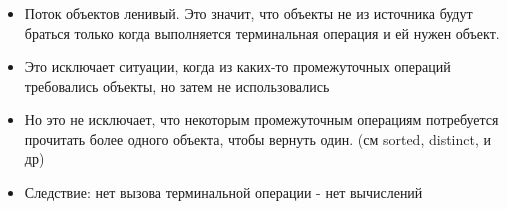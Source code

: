 \begin{frame}
\frametitle{\insertsection} 
\framesubtitle{\insertsubsection}
\begin{itemize}
	\item Поток объектов ленивый. Это значит, что объекты не из источника будут браться только когда выполняется терминальная операция и ей нужен объект.
	\item Это исключает ситуации, когда из каких-то промежуточных операций требовались объекты, но затем не использовались
	\item Но это не исключает, что некоторым промежуточным операциям потребуется прочитать более одного объекта, чтобы вернуть один. (см sorted, distinct, и др)
	\item Следствие: нет вызова терминальной операции - нет вычислений
\end{itemize}

\end{frame}